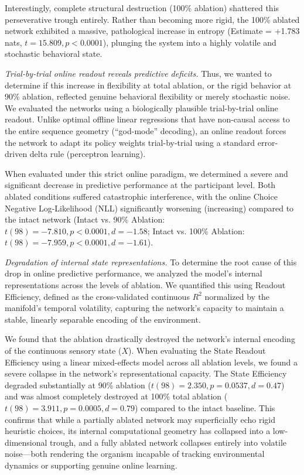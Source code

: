 \documentclass[12pt, a4paper]{extarticle}
\begin{document}
	Interestingly, complete structural destruction (100\% ablation) shattered this perseverative trough entirely. Rather than becoming more rigid, the 100\% ablated network exhibited a massive, pathological increase in entropy (Estimate = +1.783 nats, $t = 15.809, p < 0.0001$), plunging the system into a highly volatile and stochastic behavioral state.
	
	\textit{Trial-by-trial online readout reveals predictive deficits.}
	Thus, we wanted to determine if this increase in flexibility at total ablation, or the rigid behavior at 90\% ablation, reflected genuine behavioral flexibility or merely stochastic noise. We evaluated the networks using a biologically plausible trial-by-trial online readout. Unlike optimal offline linear regressions that have non-causal access to the entire sequence geometry (``god-mode'' decoding), an online readout forces the network to adapt its policy weights trial-by-trial using a standard error-driven delta rule (perceptron learning). 
	
	When evaluated under this strict online paradigm, we determined a severe and significant decrease in predictive performance at the participant level. Both ablated conditions suffered catastrophic interference, with the online Choice Negative Log-Likelihood (NLL) significantly worsening (increasing) compared to the intact network (Intact vs. 90\% Ablation: $t(98) = -7.810, p < 0.0001, d = -1.58$; Intact vs. 100\% Ablation: $t(98) = -7.959, p < 0.0001, d = -1.61$).
	
	\textit{Degradation of internal state representations.}
	To determine the root cause of this drop in online predictive performance, we analyzed the model's internal representations across the levels of ablation. We quantified this using Readout Efficiency, defined as the cross-validated continuous $R^2$ normalized by the manifold's temporal volatility, capturing the network's capacity to maintain a stable, linearly separable encoding of the environment. 
	
	We found that the ablation drastically destroyed the network's internal encoding of the continuous sensory state ($X$). When evaluating the State Readout Efficiency using a linear mixed-effects model across all ablation levels, we found a severe collapse in the network's representational capacity. The State Efficiency degraded substantially at 90\% ablation ($t(98) = 2.350, p = 0.0537, d = 0.47$) and was almost completely destroyed at 100\% total ablation ($t(98) = 3.911, p = 0.0005, d = 0.79$) compared to the intact baseline. This confirms that while a partially ablated network may superficially echo rigid heuristic choices, its internal computational geometry has collapsed into a low-dimensional trough, and a fully ablated network collapses entirely into volatile noise---both rendering the organism incapable of tracking environmental dynamics or supporting genuine online learning.
	
\end{document}
